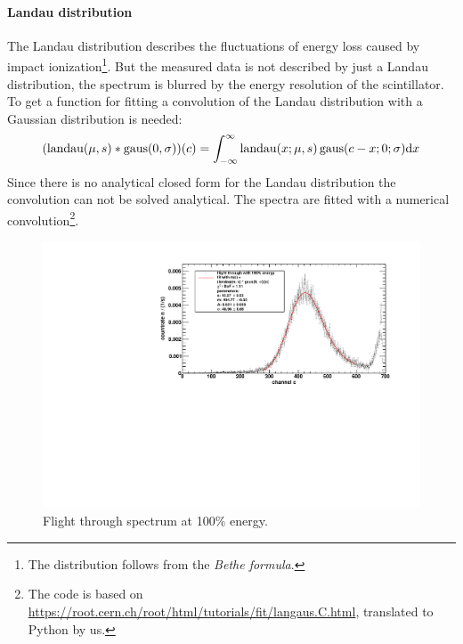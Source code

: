 \paragraph{Landau distribution}
The Landau distribution describes the fluctuations of energy loss caused by impact 
ionization\footnote{The distribution follows from the \emph{Bethe formula}.}.
But the measured data is not described by just a Landau distribution, the spectrum is blurred by the energy resolution of the scintillator. 
To get a function for fitting a convolution of the Landau distribution with a Gaussian distribution is needed:
\begin{equation}
    \label{eq:landaugausconv}
    (\operatorname{landau}(\mu, s) *  \operatorname{gaus}(0, \sigma))(c) = \int_{-\infty}^{\infty} \operatorname{landau}(x;\mu, s) \operatorname{gaus}(c-x;0;\sigma)\mathrm{d} x
\end{equation}
Since there is no analytical closed form for the Landau distribution the convolution can not be solved analytical. The spectra are fitted with a
numerical convolution\footnote{The code is based on \url{https://root.cern.ch/root/html/tutorials/fit/langaus.C.html}, translated to Python by us.}.
\begin{figure}[H]
\begin{center}
  \includegraphics[width=\textwidth]{../img/energiekalibration_100.pdf}
  \caption{Flight through spectrum at 100$\%$ energy.}
  \label{img:ecal:100}
\end{center}
\end{figure}

